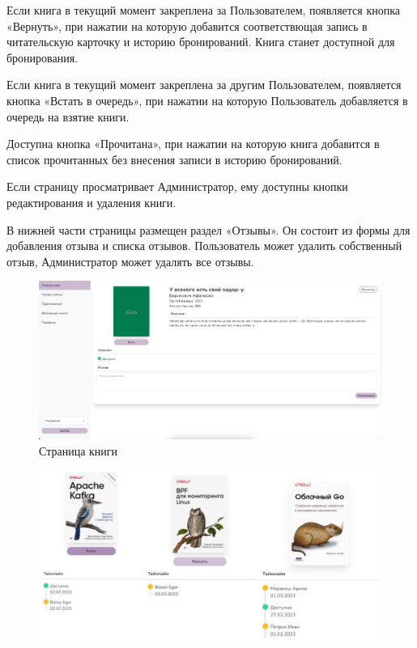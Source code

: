 \documentclass[project.tex]{subfiles}
\begin{document}
\begin{enumerate}
    \par
    Если книга в текущий момент закреплена за Пользователем, появляется кнопка «Вернуть», при нажатии на которую добавится соответствющая запись в читательскую карточку и историю бронирований. Книга станет доступной для бронирования.
    \par
    Если книга в текущий момент закреплена за другим Пользователем, появляется кнопка «Встать в очередь», при нажатии на которую Пользователь добавляется в очередь на взятие книги.
    \par
    Доступна кнопка «Прочитана», при нажатии на которую книга добавится в список прочитанных без внесения записи в историю бронирований.
    \par
    Если страницу просматривает Администратор, ему доступны кнопки редактирования и удаления книги.
    \par
    В нижней части страницы размещен раздел «Отзывы». Он состоит из формы для добавления отзыва и списка отзывов. Пользователь может удалить собственный отзыв, Администратор может удалять все отзывы.
    \begin{figure}[H]
       \label{pic:book}
       \includegraphics[width=\textwidth, frame]{../../graphics/singlebook.png}
       \caption{Страница книги} 
    \end{figure}
    \begin{figure}[H]
       \label{pic:states}
       \includegraphics[width=\textwidth, frame]{../../graphics/bookstates.png}

\end{figure}
\end{enumerate}
\end{document}
